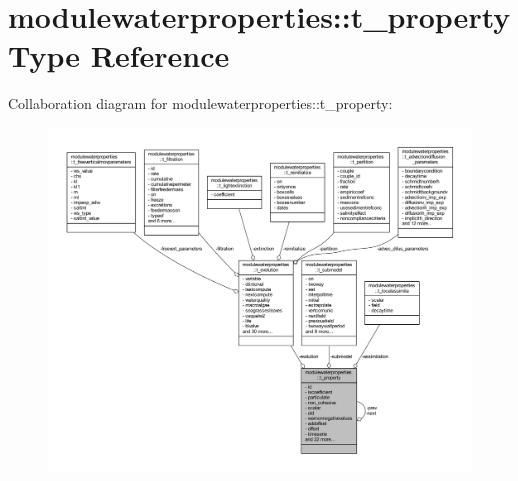 \hypertarget{structmodulewaterproperties_1_1t__property}{}\section{modulewaterproperties\+:\+:t\+\_\+property Type Reference}
\label{structmodulewaterproperties_1_1t__property}


Collaboration diagram for modulewaterproperties\+:\+:t\+\_\+property\+:\nopagebreak
\begin{figure}[H]
\begin{center}
\leavevmode
\includegraphics[width=350pt]{structmodulewaterproperties_1_1t__property__coll__graph}
\end{center}
\end{figure}
